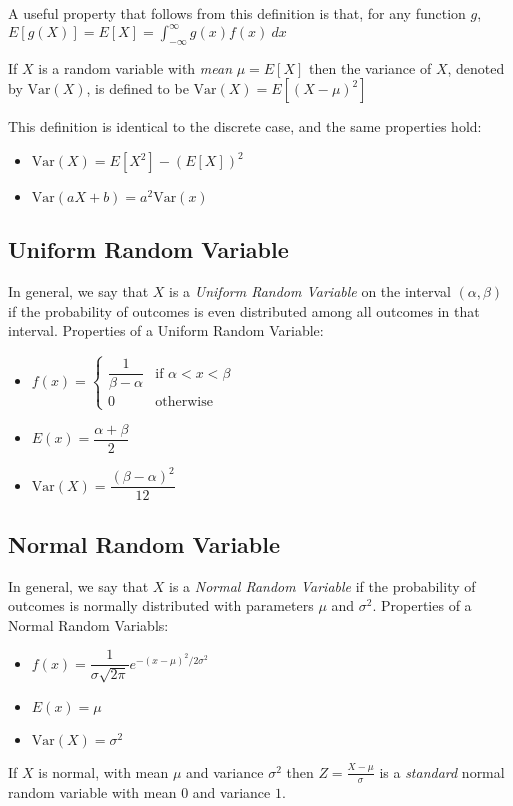 \documentclass[10pt]{article}
\theoremstyle{definition}
\theoremstyle{theorem}
\begin{document}
		A useful property that follows from this definition is that, for any function $g$, $E[g(X)]=E[X] = \int_{-\infty}^{\infty} g(x)f(x)\:dx$ 
		
		If $X$ is a random variable with \emph{mean} $\mu=E[X]$ then the variance of $X$, denoted by $\text{Var}(X)$, is defined to be $\text{Var}(X) = E[(X-\mu)^2]$
		
		This definition is identical to the discrete case, and the same properties hold:
		\begin{multicols}{2}
			\begin{itemize}
				\item $\text{Var}(X) = E[X^2] - (E[X])^2$
				\item $\text{Var}(aX + b) = a^2 \text{Var}(x)$
			\end{itemize}
		\end{multicols}
		
		\subsection*{Uniform Random Variable}
		In general, we say that $X$ is a \emph{Uniform Random Variable} on the interval $(\alpha, \beta)$ if the probability of outcomes is even distributed among all outcomes in that interval. Properties of a Uniform Random Variable:
		\begin{multicols}{3}
			\begin{itemize}
				\item $f(x) = 
					\begin{cases} 
						\dfrac{1}{\beta - \alpha} & \text{if } \alpha < x < \beta\\
						0 & \text{otherwise}
					\end{cases}$
				\item $E(x) = \dfrac{\alpha + \beta}{2}$
				\item $\text{Var}(X) = \dfrac{(\beta-\alpha)^2}{12}$
			\end{itemize}
		\end{multicols}
		
		\subsection*{Normal Random Variable}
		In general, we say that $X$ is a \emph{Normal Random Variable} if the probability of outcomes is normally distributed with parameters \(\mu\) and \(\sigma^2\). Properties of a Normal Random Variabls:
		\begin{multicols}{3}
			\begin{itemize}
				\item $f(x) = \dfrac{1}{\sigma\sqrt{2\pi}}e^{-(x-\mu)^2 / 2\sigma^2}$
				\item $E(x) = \mu$
				\item $\text{Var}(X) = \sigma^2$
			\end{itemize}
		\end{multicols}
		If \(X\) is normal, with mean \(\mu\) and variance \(\sigma^2\) then $Z=\frac{X-\mu}{\sigma}$ is a \emph{standard} normal random variable with mean \(0\) and variance \(1\).
		
\end{document}
